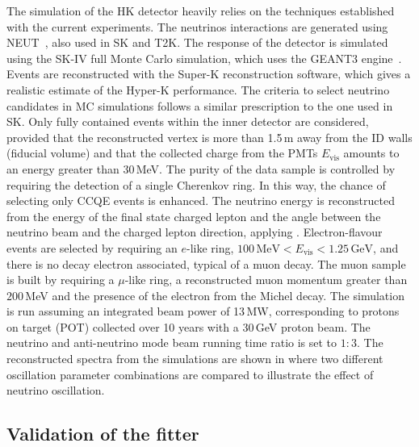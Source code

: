 The simulation of the HK detector heavily relies on the techniques established with the current experiments.
The neutrinos interactions are generated using NEUT~\cite{Hayato:2002sd}, also used in SK and T2K.
The response of the detector is simulated using the SK-IV full Monte Carlo simulation, which uses the GEANT3 engine~\cite{Brun:1994aa}.
Events are reconstructed with the Super-K reconstruction software, which gives a realistic estimate of the Hyper-K performance.
The criteria to select neutrino candidates in MC simulations follows a similar prescription to the one used in SK.
Only fully contained events within the inner detector are considered, provided that the reconstructed vertex %
is more than 1.5\,m away from the ID walls (fiducial volume) and that the collected charge from the PMTs $E_\text{vis}$ %
amounts to an energy greater than 30\,MeV.
The purity of the data sample is controlled by requiring the detection of a single Cherenkov ring.
In this way, the chance of selecting only CCQE events is enhanced.
The neutrino energy is reconstructed from the energy of the final state charged lepton and %
the angle between the neutrino beam and the charged lepton direction, applying .
Electron-flavour events are selected by requiring an $e$-like ring, $100\,\text{MeV} < E_\text{vis} < 1.25\,\text{GeV}$, %
and there is no decay electron associated, typical of a muon decay.
The muon sample is built by requiring a $\mu$-like ring, a reconstructed muon momentum greater than $200$\,MeV %
and the presence of the electron from the Michel decay.
The simulation is run assuming an integrated beam power of 13\,MW, corresponding to  protons on target (POT) %
collected over 10 years with a 30\,GeV proton beam.
The neutrino and anti-neutrino mode beam running time ratio is set to $1:3$.
The reconstructed spectra from the simulations are shown in  %
where two different oscillation parameter combinations are compared to illustrate the effect of neutrino oscillation.




\subsection{Validation of the fitter}
\label{sec:nuenorm}

